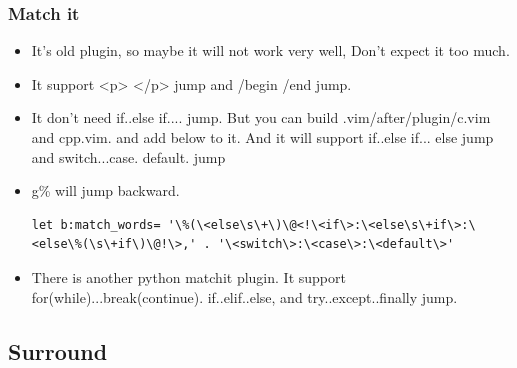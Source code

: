 \documentclass[a4paper,12pt,twoside]{book}
\begin{document}
\subsubsection{Match it}
\begin{itemize}
		\item It's old plugin, so maybe it will not work very well, Don't expect it too much.
		\item It support <p> </p> jump and /begin /end jump.
		\item It don't need if..else if.... jump. But you can build .vim/after/plugin/c.vim and cpp.vim. and add below to it. And it will support if..else if... else jump and switch...case. default. jump
		\item g\% will jump backward. 
\begin{verbatim}
let b:match_words= '\%(\<else\s\+\)\@<!\<if\>:\<else\s\+if\>:\<else\%(\s\+if\)\@!\>,' . '\<switch\>:\<case\>:\<default\>'
\end{verbatim}

	\item There is another python matchit plugin. It support for(while)...break(continue). if..elif..else, and try..except..finally jump.   
\end{itemize}

\subsection{Surround}
\end{document}
